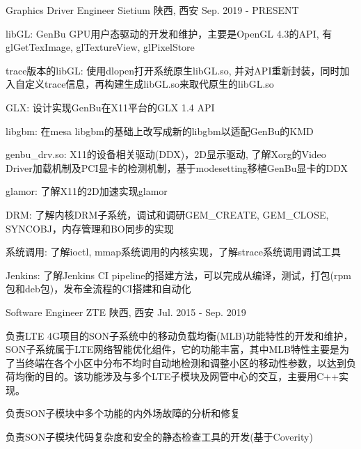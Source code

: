 
\begin{cventries}
  \cventry
    {Graphics Driver Engineer} %
    {Sietium} %
    {陕西, 西安} %
    {Sep. 2019 - PRESENT} %
    {
      \begin{cvitems} %
        \item {libGL: GenBu GPU用户态驱动的开发和维护，主要是OpenGL 4.3的API, 有glGetTexImage, glTextureView, glPixelStore}
        \item {trace版本的libGL: 使用dlopen打开系统原生libGL.so, 并对API重新封装，同时加入自定义trace信息，再构建生成libGL.so来取代原生的libGL.so}
        \item {GLX: 设计实现GenBu在X11平台的GLX 1.4 API}
        \item {libgbm: 在mesa libgbm的基础上改写成新的libgbm以适配GenBu的KMD}
        \item {genbu\_drv.so: X11的设备相关驱动(DDX)，2D显示驱动, 了解Xorg的Video Driver加载机制及PCI显卡的检测机制，基于modesetting移植GenBu显卡的DDX}
        \item {glamor: 了解X11的2D加速实现glamor}
        \item {DRM: 了解内核DRM子系统，调试和调研GEM\_CREATE, GEM\_CLOSE, SYNCOBJ，内存管理和BO同步的实现}
        \item {系统调用: 了解ioctl, mmap系统调用的内核实现，了解strace系统调用调试工具}
        \item {Jenkins: 了解Jenkins CI pipeline的搭建方法，可以完成从编译，测试，打包(rpm包和deb包)，发布全流程的CI搭建和自动化}
      \end{cvitems}
    }

  \cventry
    {Software Engineer} %
    {ZTE} %
    {陕西, 西安} %
    {Jul. 2015 - Sep. 2019} %
    {
      \begin{cvitems} %
        \item {负责LTE 4G项目的SON子系统中的移动负载均衡(MLB)功能特性的开发和维护，SON子系统属于LTE网络智能优化组件，它的功能丰富，其中MLB特性主要是为了当终端在各个小区中分布不均时自动地检测和调整小区的移动性参数，以达到负荷均衡的目的。该功能涉及与多个LTE子模块及网管中心的交互，主要用C++实现。}
		\item {负责SON子模块中多个功能的内外场故障的分析和修复}
        \item {负责SON子模块代码复杂度和安全的静态检查工具的开发(基于Coverity)}
      \end{cvitems}
    }
\end{cventries}
